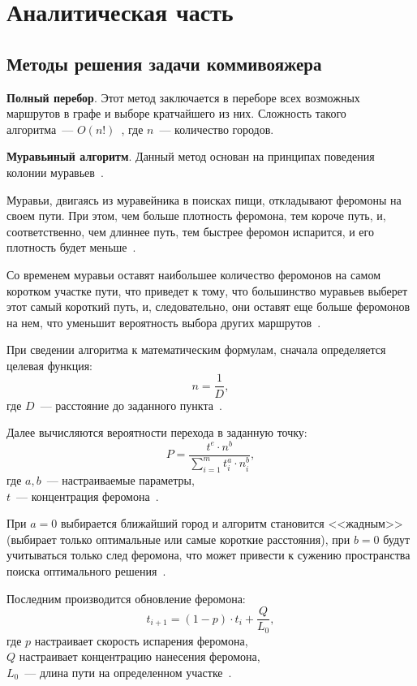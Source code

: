 \chapter{Аналитическая часть}
\section{Методы решения задачи коммивояжера}

\textbf{Полный перебор}.
Этот метод заключается в переборе всех возможных маршрутов в графе и выборе кратчайшего из них.
Сложность такого алгоритма~--- $O(n!)$~\cite{tsp-solutions}, где $n$~--- количество городов.

\textbf{Муравьиный алгоритм}.
Данный метод основан на принципах поведения колонии муравьев~\cite{tsp-solutions}.

Муравьи, двигаясь из муравейника в поисках пищи, откладывают феромоны на своем пути.
При этом, чем больше плотность феромона, тем короче путь, и, соответственно, чем длиннее путь, тем быстрее феромон испарится, и его плотность будет меньше~\cite{ants-alg}.

Со временем муравьи оставят наибольшее количество феромонов на самом коротком участке пути, что приведет к тому, что большинство муравьев выберет этот самый короткий путь, и, следовательно, они оставят еще больше феромонов на нем, что уменьшит вероятность выбора других маршрутов~\cite{ants-alg}.

При сведении алгоритма к математическим формулам, сначала определяется целевая функция:
\begin{equation}
	\label{eqn:target-func}
	n = \frac{1}{D},
\end{equation}
где $D$~--- расстояние до заданного пункта~\cite{ants-alg}.

Далее вычисляются вероятности перехода в заданную точку:
\begin{equation}
	P = \frac{t^e \cdot n^b}{\sum_{i=1}^{m} t_i^a \cdot n_i^b},
\end{equation}
где $a,b$~--- настраиваемые параметры,
\\ $t$~--- концентрация феромона~\cite{ants-alg}.

При $a = 0$ выбирается ближайший город и алгоритм становится <<жадным>> (выбирает только оптимальные или самые короткие расстояния), при $b = 0$ будут учитываться только след феромона, что может привести к сужению пространства поиска оптимального решения~\cite{ants-alg}. 

Последним производится обновление феромона:
\begin{equation}
	t_{i+1} = (1 - p) \cdot t_i + \frac{Q}{L_0},
\end{equation}
где $p$ настраивает скорость испарения феромона,
\\ $Q$ настраивает концентрацию нанесения феромона,
\\ $L_0$~--- длина пути на определенном участке~\cite{ants-alg}.

